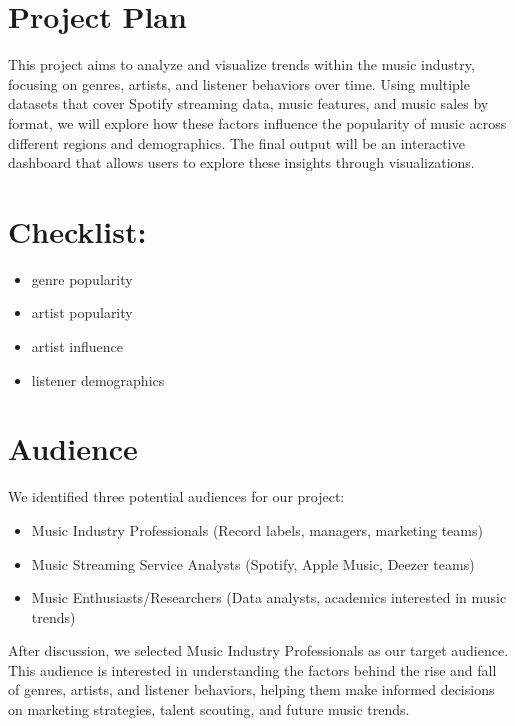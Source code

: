 \documentclass[12pt]{article}
\begin{document}

\section*{Project Plan}
This project aims to analyze and visualize trends within the music industry, focusing on genres, artists, and listener behaviors over time. Using multiple datasets that cover Spotify streaming data, music features, and music sales by format, we will explore how these factors influence the popularity of music across different regions and demographics. The final output will be an interactive dashboard that allows users to explore these insights through visualizations.

\section*{Checklist:}
\begin{itemize}
  \item genre popularity
  \item artist popularity
  \item artist influence
  \item listener demographics
\end{itemize}

\section*{Audience}
We identified three potential audiences for our project:

\begin{itemize}
  \item Music Industry Professionals (Record labels, managers, marketing teams)
  \item Music Streaming Service Analysts (Spotify, Apple Music, Deezer teams)
  \item Music Enthusiasts/Researchers (Data analysts, academics interested in music trends)
\end{itemize}

After discussion, we selected Music Industry Professionals as our target audience. This audience is interested in understanding the factors behind the rise and fall of genres, artists, and listener behaviors, helping them make informed decisions on marketing strategies, talent scouting, and future music trends.
\end{document}
